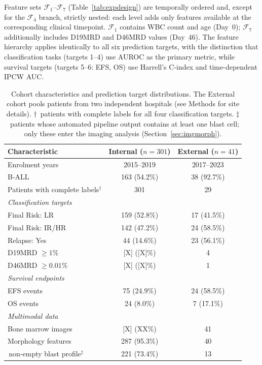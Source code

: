 \documentclass[pdflatex,sn-nature]{sn-jnl}
\begin{document}
Feature sets $\mathcal{F}_1$--$\mathcal{F}_7$
(Table~\ref{tab:expdesign}) are temporally ordered and, except for the
$\mathcal{F}_4$ branch, strictly nested: each level adds only features
available at the corresponding clinical timepoint.
$\mathcal{F}_1$ contains WBC count and age (Day~0);
$\mathcal{F}_7$ additionally includes D19MRD and D46MRD values (Day~46).
The feature hierarchy applies identically to all six prediction
targets, with the distinction that classification tasks (targets 1--4)
use AUROC as the primary metric, while survival targets (targets 5--6:
EFS, OS) use Harrell's C-index and time-dependent IPCW AUC.

\begin{table}[ht]
\caption{Cohort characteristics and prediction target distributions.
The External cohort pools patients from two independent hospitals
(see Methods for site details).
$\dagger$~patients with complete labels
for all four classification targets.
$\ddagger$~patients whose automated pipeline output contains at least
one blast cell; only these enter the imaging analysis
(Section~\ref{sec:imgmorph}).}
\label{tab:cohort}
\centering
\small
\begin{tabular}{lcc}
\toprule
\textbf{Characteristic}
  & \textbf{Internal} ($n=301$)
  & \textbf{External} ($n=41$) \\
\midrule
Enrolment years & 2015--2019 & 2017--2023 \\
B-ALL & 163 (54.2\%) & 38 (92.7\%) \\
Patients with complete labels$^\dagger$ & 301 & 29 \\
\midrule
\multicolumn{3}{l}{\textit{Classification targets}} \\
Final Risk: LR & 159 (52.8\%) & 17 (41.5\%) \\
Final Risk: IR/HR & 142 (47.2\%) & 24 (58.5\%) \\
Relapse: Yes & 44 (14.6\%) & 23 (56.1\%) \\
D19MRD $\geq 1\%$ & [X] ([X]\%) & 4 \\
D46MRD $\geq 0.01\%$ & [X] ([X]\%) & 1 \\
\midrule
\multicolumn{3}{l}{\textit{Survival endpoints}} \\
EFS events & 75 (24.9\%) & 24 (58.5\%) \\
OS events & 24 (8.0\%) & 7 (17.1\%) \\
\midrule
\multicolumn{3}{l}{\textit{Multimodal data}} \\
Bone marrow images & [X] (XX\%) & 41 \\
Morphology features & 287 (95.3\%) & 40 \\
\;\,non-empty blast profile$^\ddagger$ & 221 (73.4\%) & 13 \\
\bottomrule
\end{tabular}
\end{table}
\end{document}
